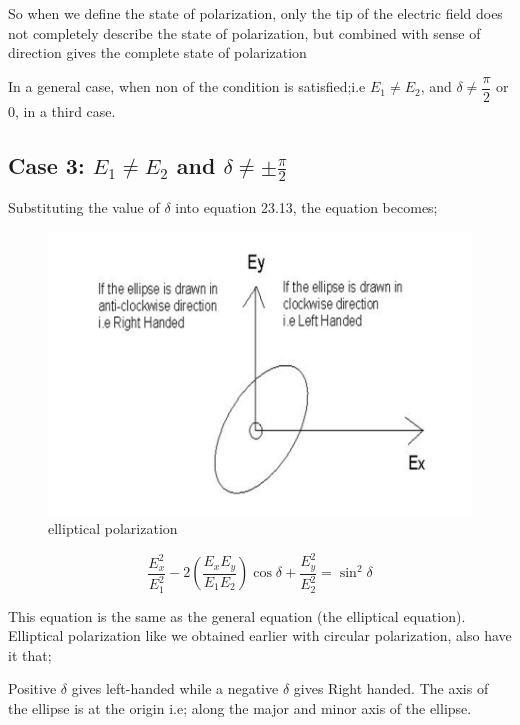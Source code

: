 So when we define the state of polarization, only the tip of the electric field does not completely describe the state of polarization, but combined with sense of direction gives the complete state of polarization

In a general case, when non of the condition is satisfied;i.e $ E_1 \neq E_2$, and $\delta\neq\dfrac{\pi}{2}$ or $ 0 $, in a third case.

\subsection{Case 3: \texorpdfstring{$E_1\neq E_2$}{E1≠E2} and \texorpdfstring{$\delta\neq\pm\frac{\pi}{2}$}{δ≠𝜆/2}}
Substituting the value of $\delta$ into equation 23.13, the equation becomes;
\begin{figure}[h]
\centering
\includegraphics[width=.8\linewidth]{./graphics/ellipse}
\caption{elliptical polarization}
\end{figure}

\begin{equation}
\frac{E_{x}^2}{E_{1}^2} -2(\frac{E_{x}E_{y}}{E_{1}E_{2}})\cos\delta + \frac{E_{y}^2}{E_{2}^2} =\sin^2 \delta
\end{equation}

This equation is the same as the general equation (the elliptical equation). Elliptical polarization like we obtained earlier with circular polarization, also have it that;

Positive $\delta$ gives left-handed while a negative $\delta$ gives Right handed. The axis of the ellipse is at the origin i.e; along the major and minor axis of the ellipse.

